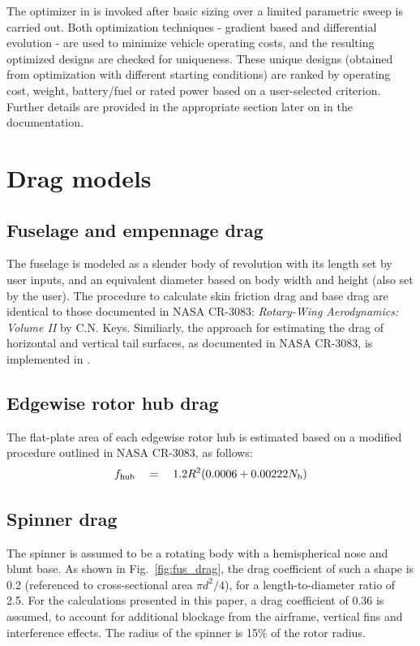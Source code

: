 The optimizer in \hydra \spc is invoked after basic sizing over a limited parametric sweep is carried out. Both optimization techniques - gradient based and differential evolution - are used to minimize vehicle operating costs, and the resulting optimized designs are checked for uniqueness. These unique designs (obtained from optimization with different starting conditions) are ranked by operating cost, weight, battery/fuel or rated power based on a user-selected criterion. Further details are provided in the appropriate section later on in the documentation. 

\section{Drag models}

\subsection{Fuselage and empennage drag}
The fuselage is modeled as a slender body of revolution with its length set by user inputs, and an equivalent diameter based on body width and height (also set by the user). The procedure to calculate skin friction drag and base drag are identical to those documented in NASA CR-3083: \emph{ Rotary-Wing Aerodynamics: Volume II} by C.N. Keys. Similiarly, the approach for estimating the drag of horizontal and vertical tail surfaces, as documented in NASA CR-3083, is implemented in \hydra.

\subsection{Edgewise rotor hub drag}
The flat-plate area of each edgewise rotor hub is estimated based on a modified procedure outlined in NASA CR-3083, as follows:
\begin{equation}
f_{\rm hub} \quad = \quad 1.2 R^2 (0.0006 + 0.00222 N_{\rm b})
\end{equation}

\subsection{Spinner drag}

The spinner is assumed to be a rotating body with a hemispherical nose and blunt base. As shown in Fig.~\ref{fig:fus_drag}, the drag coefficient of such a shape is 0.2 (referenced to cross-sectional area $\pi d^2/4$), for a length-to-diameter ratio of 2.5. For the calculations presented in this paper, a drag coefficient of 0.36 is assumed, to account for additional blockage from the airframe, vertical fins and interference effects. The radius of the spinner is 15\% of the rotor radius. 

